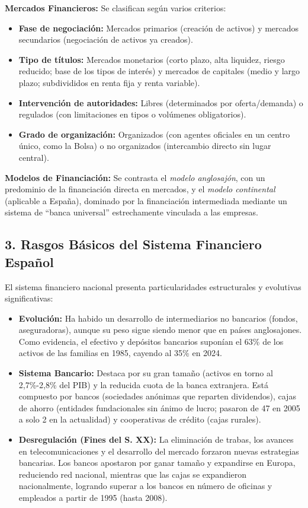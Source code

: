 \textbf{Mercados Financieros:}
Se clasifican según varios criterios:
\begin{itemize}
  \item \textbf{Fase de negociación:} Mercados primarios (creación de activos) y mercados secundarios (negociación de activos ya creados).
  \item \textbf{Tipo de títulos:} Mercados monetarios (corto plazo, alta liquidez, riesgo reducido; base de los tipos de interés) y mercados de capitales (medio y largo plazo; subdivididos en renta fija y renta variable).
  \item \textbf{Intervención de autoridades:} Libres (determinados por oferta/demanda) o regulados (con limitaciones en tipos o volúmenes obligatorios).
  \item \textbf{Grado de organización:} Organizados (con agentes oficiales en un centro único, como la Bolsa) o no organizados (intercambio directo sin lugar central).
\end{itemize}

\textbf{Modelos de Financiación:}
Se contrasta el \textit{modelo anglosajón}, con un predominio de la financiación directa en mercados, y el \textit{modelo continental} (aplicable a España), dominado por la financiación intermediada mediante un sistema de ``banca universal'' estrechamente vinculada a las empresas.

\subsection*{3. Rasgos Básicos del Sistema Financiero Español}

El sistema financiero nacional presenta particularidades estructurales y evolutivas significativas:

\begin{itemize}
  \item \textbf{Evolución:} Ha habido un desarrollo de intermediarios no bancarios (fondos, aseguradoras), aunque su peso sigue siendo menor que en países anglosajones. Como evidencia, el efectivo y depósitos bancarios suponían el 63\% de los activos de las familias en 1985, cayendo al 35\% en 2024.
  \item \textbf{Sistema Bancario:} Destaca por su gran tamaño (activos en torno al 2,7\%-2,8\% del PIB) y la reducida cuota de la banca extranjera. Está compuesto por bancos (sociedades anónimas que reparten dividendos), cajas de ahorro (entidades fundacionales sin ánimo de lucro; pasaron de 47 en 2005 a solo 2 en la actualidad) y cooperativas de crédito (cajas rurales).
  \item \textbf{Desregulación (Fines del S. XX):} La eliminación de trabas, los avances en telecomunicaciones y el desarrollo del mercado forzaron nuevas estrategias bancarias. Los bancos apostaron por ganar tamaño y expandirse en Europa, reduciendo red nacional, mientras que las cajas se expandieron nacionalmente, logrando superar a los bancos en número de oficinas y empleados a partir de 1995 (hasta 2008).
\end{itemize}

